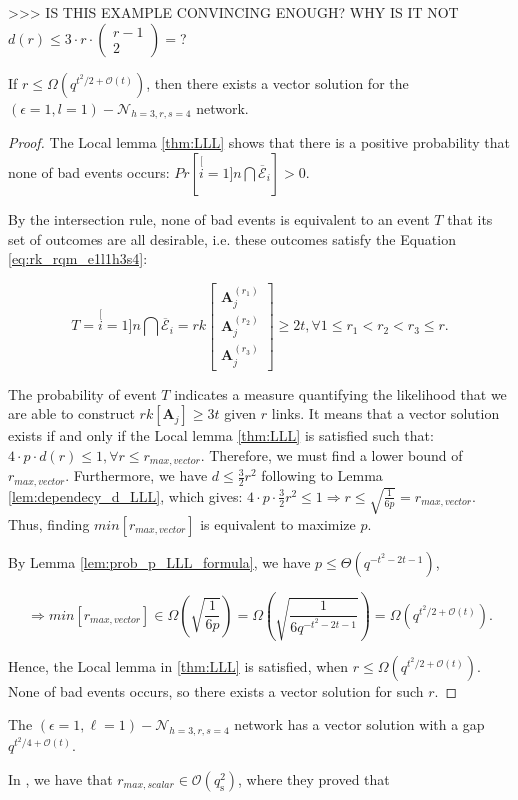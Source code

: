 >\textcompwordmark >\textcompwordmark > IS THIS EXAMPLE CONVINCING
ENOUGH? WHY IS IT NOT $d(r)\leq3\cdot r\cdot\left(\begin{array}{c}
r-1\\
2
\end{array}\right)=$?
\begin{thm}
If $r\leq\Omega\left(q^{t^{2}/2+\mathcal{O}\left(t\right)}\right)$,
then there exists a vector solution for the $\left(\epsilon=1,l=1\right)-\mathcal{N}_{h=3,r,s=4}$
network. \label{theo:r_for_vector_sol_e1l1h3rs4}
\end{thm}
\begin{proof}
The Local lemma \ref{thm:LLL} shows that there is a positive probability
that none of bad events occurs: $Pr\left[\stackrel[i=1]{n}{\bigcap}\overline{\mathcal{E}}_{i}\right]>0$.

By the intersection rule, none of bad events is equivalent to an event
$T$ that its set of outcomes are all desirable, i.e. these outcomes
satisfy the Equation \ref{eq:rk_rqm_e1l1h3s4}:

\[
T=\stackrel[i=1]{n}{\bigcap}\overline{\mathcal{E}}_{i}=rk\left[\begin{array}{c}
\boldsymbol{A}_{j}^{\left(r_{1}\right)}\\
\boldsymbol{A}_{j}^{\left(r_{2}\right)}\\
\boldsymbol{A}_{j}^{\left(r_{3}\right)}
\end{array}\right]\geq2t,\forall1\leq r_{1}<r_{2}<r_{3}\leq r.
\]

The probability of event $T$ indicates a measure quantifying the
likelihood that we are able to construct $rk\left[\boldsymbol{A}_{j}\right]\geq3t$
given $r$ links. It means that a vector solution exists if and only
if the Local lemma \ref{thm:LLL} is satisfied such that: $4\cdot p\cdot d(r)\leq1,\forall r\leq r_{max,vector}$.
Therefore, we must find a lower bound of $r_{max,vector}$. Furthermore,
we have $d\leq\frac{3}{2}r^{2}$ following to Lemma \ref{lem:dependecy_d_LLL},
which gives: $4\cdot p\cdot\frac{3}{2}r^{2}\leq1\Rightarrow r\leq\sqrt{\frac{1}{6p}}=r_{max,vector}$.
Thus, finding $min\left[r_{max,vector}\right]$ is equivalent to maximize
$p$. 

By Lemma \ref{lem:prob_p_LLL_formula}, we have $p\leq\Theta\left(q^{-t^{2}-2t-1}\right)$,

\[
\Rightarrow min\left[r_{max,vector}\right]\in\Omega\left(\sqrt{\frac{1}{6p}}\right)=\Omega\left(\sqrt{\frac{1}{6q^{-t^{2}-2t-1}}}\right)=\Omega\left(q^{t^{2}/2+\mathcal{O}\left(t\right)}\right).
\]

Hence, the Local lemma in \ref{thm:LLL} is satisfied, when $r\leq\Omega\left(q^{t^{2}/2+\mathcal{O}\left(t\right)}\right)$.
None of bad events occurs, so there exists a vector solution for such
$r$.
\end{proof}
\begin{cor}
The $\left(\epsilon=1,\ell=1\right)-\mathcal{N}_{h=3,r,s=4}$ network
has a vector solution with a gap $q^{t^{2}/4+\mathcal{O}(t)}$.
\end{cor}
In \cite[Sec. VIII-C]{Wachter-Zeh:2018}, we have that $r_{max,scalar}\in\mathcal{O}\left(q_{\mathrm{s}}^{2}\right)$,
where they proved that 

